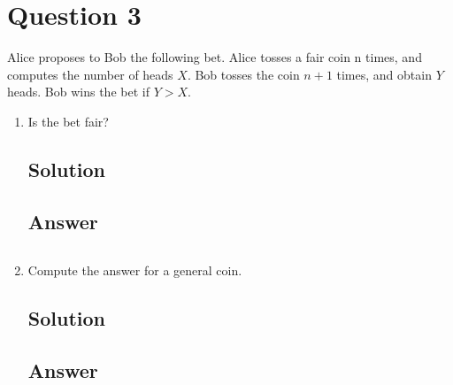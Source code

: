 \documentclass[12pt]{article}
\begin{document}
	
	\section*{Question 3}
	
	\noindent Alice proposes to Bob the following bet. Alice tosses a fair coin n times, and computes the number of heads $X$. Bob tosses the coin $n+1$ times, and obtain $Y$ heads. Bob wins the bet if $Y > X$.
	
	\bigskip
	
	\begin{enumerate}[start=1,label={\bfseries Part \arabic*:},leftmargin=0in]
		\bigskip\item Is the bet fair?
		
		\subsection*{Solution}
		
		\subsection*{Answer}
		
			\[\boxed{}\]
		
		\bigskip\item Compute the answer for a general coin.
		
		\subsection*{Solution}
		
		\subsection*{Answer}
		
			\[\boxed{}\]
	\end{enumerate}
	
\end{document}
